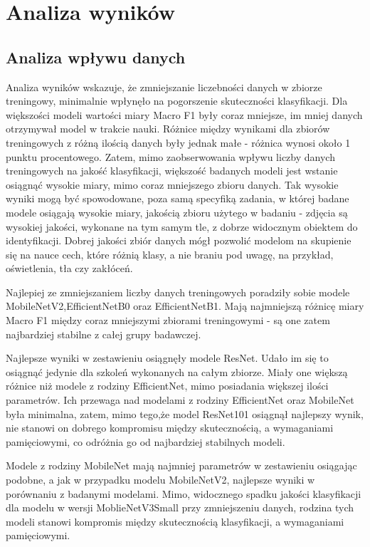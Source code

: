 \clearpage
\newpage
\section{Analiza wyników}
\label{sec:analiza}
\subsection{Analiza wpływu danych}
Analiza wyników wskazuje, że zmniejszanie liczebności danych w zbiorze treningowy, minimalnie wpłynęło na pogorszenie skuteczności klasyfikacji. Dla większości modeli wartości miary Macro F1 były coraz mniejsze, im mniej danych otrzymywał model \newline w trakcie nauki. Różnice między wynikami dla zbiorów treningowych z różną ilością danych były jednak małe - różnica wynosi około 1 punktu procentowego. Zatem, mimo zaobserwowania wpływu liczby danych treningowych na jakość klasyfikacji, większość badanych modeli jest wstanie osiągnąć wysokie miary, mimo coraz mniejszego zbioru danych.  Tak wysokie wyniki mogą być spowodowane, poza samą specyfiką zadania, \newline w której badane modele osiągają wysokie miary, jakością zbioru użytego w badaniu - zdjęcia są wysokiej jakości, wykonane na tym samym tle, z dobrze widocznym obiektem do identyfikacji. Dobrej jakości zbiór danych mógł pozwolić modelom na skupienie się na nauce cech, które różnią klasy, a nie braniu pod uwagę, na przykład, oświetlenia, tła czy zakłóceń. 

Najlepiej ze zmniejszaniem liczby danych treningowych poradziły sobie modele MobileNetV2,EfficientNetB0 oraz  EfficientNetB1. Mają najmniejszą różnicę miary Macro F1 między coraz mniejszymi zbiorami treningowymi - są one zatem najbardziej stabilne \newline z całej grupy badawczej. 

Najlepsze wyniki w zestawieniu osiągnęły modele ResNet. Udało im się to osiągnąć jedynie dla szkoleń wykonanych na całym zbiorze. Miały one większą różnice niż modele z rodziny EfficientNet, mimo posiadania większej ilości parametrów. Ich przewaga nad modelami z rodziny EfficientNet oraz MobileNet była minimalna, zatem, mimo tego,\newline że model ResNet101 osiągnął najlepszy wynik, nie stanowi on dobrego kompromisu między skutecznością, a wymaganiami pamięciowymi, co odróżnia go od najbardziej stabilnych modeli. 

Modele z rodziny MobileNet mają najmniej parametrów w zestawieniu osiągając podobne, a jak w przypadku modelu MobileNetV2, najlepsze wyniki w porównaniu \newline z badanymi modelami. Mimo, widocznego spadku jakości klasyfikacji dla modelu w wersji MoblieNetV3Small przy zmniejszeniu danych, rodzina tych modeli stanowi kompromis między skutecznością klasyfikacji, a wymaganiami pamięciowymi. 

